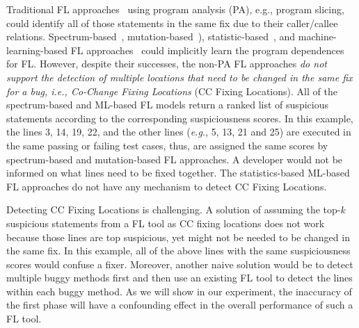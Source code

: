 Traditional FL approaches~\cite{zhang-fse09} using program analysis (PA), e.g.,
program slicing, could identify all of those statements in the same
fix due to their caller/callee
relations. Spectrum-based~\cite{tarantula05,Ochiai},
mutation-based~\cite{MUSE,papadakis2012using,Metallaxis}),
statistic-based~\cite{liblit-pldi05}, and machine-learning-based FL
approaches~\cite{DeepFL,icse21-fl} could implicitly learn the program
dependences for FL. However, despite their successes, the non-PA FL
approaches {\em do not support the detection of multiple locations
  that need to be changed in the same fix for a bug, i.e., Co-Change
  Fixing Locations} (CC Fixing Locations).
%
All of the spectrum-based and ML-based FL models return a ranked list
of suspicious statements according to the corresponding suspiciousness
scores. In this example, the lines 3, 14, 19, 22, and the other lines
({\em e.g.}, 5, 13, 21 and 25) are executed in the same passing or
failing test cases, thus, are assigned the same scores by
spectrum-based and mutation-based FL approaches. A developer would not
be informed on what lines need to be fixed together. The
statistics-based ML-based FL approaches do not have any mechanism to
detect CC Fixing Locations.

Detecting CC Fixing Locations is challenging. A solution of assuming
the top-$k$ suspicious statements from a FL tool as CC fixing
locations does not work because those lines are top suspicious, yet
might not be needed to be changed in the same fix. In this example,
all of the above lines with the same suspiciousness scores would
confuse a fixer. Moreover, another naive solution would be to
detect multiple buggy methods first and then use an existing FL tool
to detect the lines within each buggy method. As we will show in our
experiment, the inaccuracy of the first phase will have a confounding
effect in the overall performance of such a FL tool.


